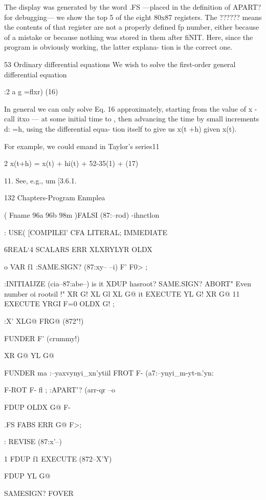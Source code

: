 {The display was generated by the word .FS —placed in the
definition of APART? for debugging— we show the top 5 of the
eight 80x87 registers. The ?????? means the contents of that
register are not a properly defined fp number, either because of
a mistake or because nothing was stored in them after fiNIT.
Here, since the program is obviously working, the latter explana-
tion is the correct one.

53 Ordinary differential equations
We wish to solve the first-order general differential equation

:2 a g =flxr) (16)

In general we can only solve Eq. 16 approximately, starting from
the value of x - call itxo — at some initial time to , then advancing
the time by small increments d: =h, using the differential equa-
tion itself to give us x(t +h) given x(t).

For example, we could emand in Taylor’s series11

2
x(t+h) = x(t) + hi(t) + 52-35(1) + (17)

 

11. See, e.g., um [3.6.1.

132 Chapters-Program Enmplea

\USE( Fname 96a 96b 98m )FALSI
(87:--rod)
\meeisthemmeoiaFORTl-ihnctlon

\iunctionnotation
: USE( [COMPILEl' CFA LITERAL;
IMMEDIATE

6REAL‘4 SCALARS ERR XLXRYLYR OLDX

o VAR f1 \apiacetostorecia
:SAME.SIGN? (87:xy-- --i)
F' F0> ;

:INITIAIJZE (cia--87:abe--)
is it \storecia
XDUP \interval hasroot?
SAME.SIGN?
ABORT" Even number oi rootsil !"
XR G! XL Gl
XL G@ it EXECUTE YL G!
XR G@ 11 EXECUTE YRGI
F=0 OLDX G! ;

 

:X' XLG@ FRG@ (872"!)

FUNDER F' (crummy!)

XR G@ YL G@

FUNDER ma :--yaxvynyi_xn'ytiil
FROT F- (a7:--ynyi_m-yt-n.'yn:

F-ROT F- fl ;
:APART'? (arr-qr --o

FDUP OLDX G@ F-

.FS FABS ERR G@ F>;

: REVISE (87:x'--)

1
FDUP f1 EXECUTE (872--X'Y)

FDUP YL G@

SAMESIGN? FOVER

}
